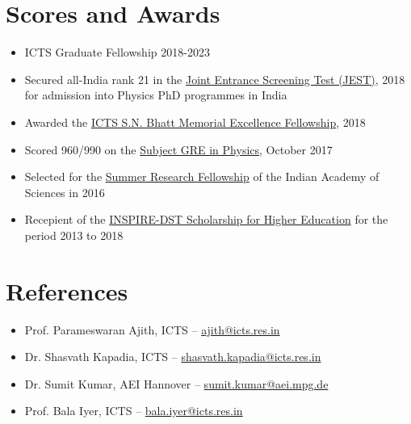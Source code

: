 \documentclass[margin, centered]{res}
\begin{document}
\begin{resume}
\section{Scores and Awards}
\begin{itemize}[leftmargin=*]
 \item ICTS Graduate Fellowship 2018-2023
 \item Secured all-India rank 21 in the \href{https://www.jest.org.in/}{Joint Entrance Screening Test (JEST)}, 2018 for admission into Physics PhD programmes in India
 \item Awarded the \href{https://www.icts.res.in/academic/summer-research-program}{ICTS S.N. Bhatt Memorial Excellence Fellowship}, 2018
 \item Scored 960/990 on the \href{https://www.ets.org/gre/subject/about/content/physics}{Subject GRE in Physics}, October 2017
 \item Selected for the \href{http://web-japps.ias.ac.in:8080/fellowship2018/}{Summer Research Fellowship} of the Indian Academy of Sciences in 2016
 \item Recepient of the \href{http://www.inspire-dst.gov.in/scholarship.html}{INSPIRE-DST Scholarship for Higher Education} for the period 2013 to 2018
\end{itemize}

\section{References}
\begin{itemize}[leftmargin=*]
 \item Prof. Parameswaran Ajith, ICTS -- \href{mailto:ajith@icts.res.in}{ajith@icts.res.in}
 \item Dr. Shasvath Kapadia, ICTS -- \href{mailto:shasvath.kapadia@icts.res.in}{shasvath.kapadia@icts.res.in}
 \item Dr. Sumit Kumar, AEI Hannover -- \href{mailto:sumit.kumar@aei.mpg.de}{sumit.kumar@aei.mpg.de}
 \item Prof. Bala Iyer, ICTS -- \href{mailto:bala.iyer@icts.res.in}{bala.iyer@icts.res.in}
\end{itemize}

\end{resume}
\end{document}
